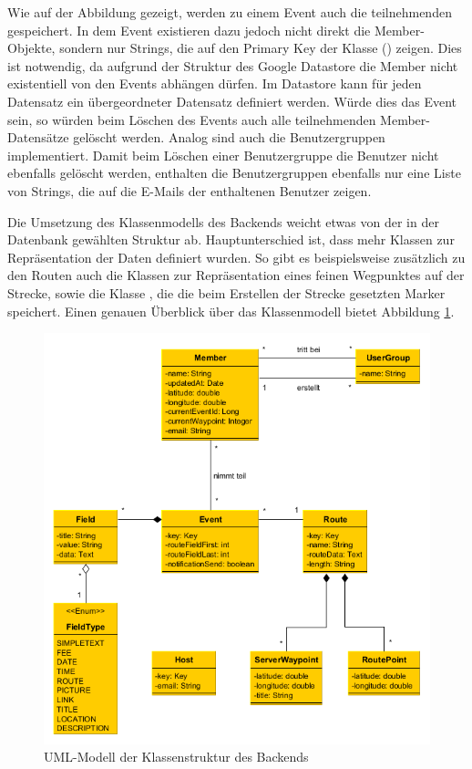 Wie auf der Abbildung gezeigt, werden zu einem Event auch die teilnehmenden  gespeichert. In dem Event existieren dazu jedoch nicht direkt die Member-Objekte, sondern nur Strings, die auf den Primary Key der Klasse  () zeigen. Dies ist notwendig, da aufgrund der Struktur des Google Datastore die Member nicht existentiell von den Events abhängen dürfen. Im Datastore kann für jeden Datensatz ein übergeordneter Datensatz definiert werden. Würde dies das Event sein, so würden beim Löschen des Events auch alle teilnehmenden Member-Datensätze gelöscht werden. Analog sind auch die Benutzergruppen implementiert. Damit beim Löschen einer Benutzergruppe die Benutzer nicht ebenfalls gelöscht werden, enthalten die Benutzergruppen ebenfalls nur eine Liste von Strings, die auf die E-Mails der enthaltenen Benutzer zeigen.

Die Umsetzung des Klassenmodells des Backends weicht etwas von der in der Datenbank gewählten Struktur ab. Hauptunterschied ist, dass mehr Klassen zur Repräsentation der Daten definiert wurden. So gibt es beispielsweise zusätzlich zu den Routen auch die Klassen  zur Repräsentation eines feinen Wegpunktes auf der Strecke, sowie die Klasse , die die beim Erstellen der Strecke gesetzten Marker speichert. Einen genauen Überblick über das Klassenmodell bietet Abbildung \ref{fig:backend_uml}.

\begin{figure}[htb]
\includegraphics[width=\textwidth]{graphics/backend_uml.png}
\caption{UML-Modell der Klassenstruktur des Backends}
\label{fig:backend_uml}
\end{figure}

